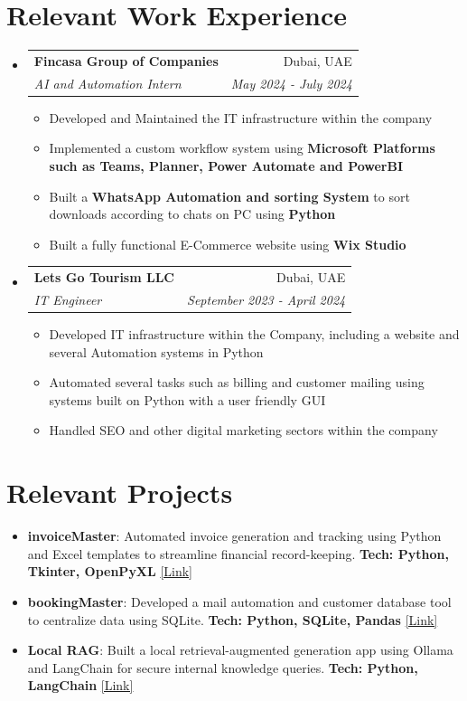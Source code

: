 \documentclass[a4paper,20pt]{article}
\makeatletter
\newcommand{\resumeItem}[2] {
	\item\small{
		\textbf{#1}{: #2 \vspace{-2pt}}
	}
}
\newcommand{\resumeItemWithoutTitle}[1] {
	\item\small{
		{#1 \vspace{-2pt}}
	}
}
\newcommand{\resumeSubheading}[4] {
	\vspace{-1pt}\item
	\begin{tabular*}{0.97\textwidth}{l@{\extracolsep{\fill}}r}
		\textbf{#1} & #2 \\
		\textit{#3} & \textit{#4} \\
	\end{tabular*}\vspace{-5pt}
}
\newcommand{\resumeSubItem}[2]{\resumeItem{#1}{#2}\vspace{-3pt}}
\newcommand{\resumeSubHeadingListStart}{\begin{itemize}[leftmargin=*]}
\newcommand{\resumeSubHeadingListEnd}{\end{itemize}}
\newcommand{\resumeItemListStart}{\begin{itemize}}
\newcommand{\resumeItemListEnd}{\end{itemize}\vspace{-5pt}}
\makeatother
\begin{document}
\vspace{1pt}

\section{Relevant Work Experience}
	\resumeSubHeadingListStart
		\resumeSubheading{Fincasa Group of Companies}{Dubai, UAE} {AI and Automation Intern}{May 2024 - July 2024}
		\resumeItemListStart
			\resumeItemWithoutTitle{Developed and Maintained the IT infrastructure within the company}
			\resumeItemWithoutTitle{Implemented a custom workflow system using \textbf{Microsoft Platforms such as Teams, Planner, Power Automate and PowerBI}}
			\resumeItemWithoutTitle{Built a \textbf{WhatsApp Automation and sorting System} to sort downloads according to chats on PC using \textbf{Python}}
            \resumeItemWithoutTitle{Built a fully functional E-Commerce website using \textbf{Wix Studio}}
		\resumeItemListEnd
		\vspace{5pt}
		\resumeSubheading{Lets Go Tourism LLC}{Dubai, UAE} {IT Engineer}{September 2023 - April 2024}
		\resumeItemListStart
			\resumeItemWithoutTitle{Developed IT infrastructure within the Company, including a website and several Automation systems in Python}
			\resumeItemWithoutTitle{Automated several tasks such as billing and customer mailing using systems built on Python with a user friendly GUI}
			\resumeItemWithoutTitle{Handled SEO and other digital marketing sectors within the company}
		\resumeItemListEnd
	\resumeSubHeadingListEnd
\vspace{-2pt}

\section{Relevant Projects}
\resumeSubHeadingListStart
    \resumeSubItem{invoiceMaster}{Automated invoice generation and tracking using Python and Excel templates to streamline financial record-keeping. \textbf{Tech: Python, Tkinter, OpenPyXL} \href{https://github.com/adityashibu/invoiceMaster}{[Link]}}
    \resumeSubItem{bookingMaster}{Developed a mail automation and customer database tool to centralize data using SQLite. \textbf{Tech: Python, SQLite, Pandas} \href{https://github.com/adityashibu/bookingMaster}{[Link]}}
    \resumeSubItem{Local RAG}{Built a local retrieval-augmented generation app using Ollama and LangChain for secure internal knowledge queries. \textbf{Tech: Python, LangChain} \href{https://github.com/jonathanjthomas/GDG-RAG-Demo}{[Link]}}
\resumeSubHeadingListEnd
\vspace{-3pt}
\end{document}
